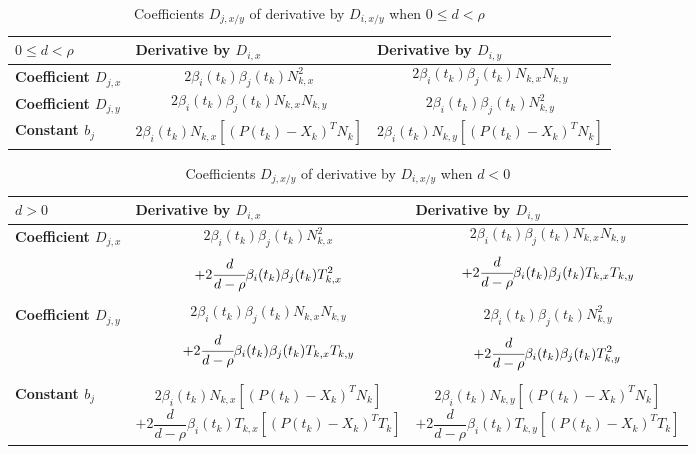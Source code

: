 \documentclass{article}
\begin{document}
\begin{table}[H]
    \centering
    \begin{tabular}{|l|p{6cm}|p{6cm}|}
        \hline
        $0 \leq d < \rho$
        &
        \textbf{Derivative by $D_{i,x}$}
        &
        \textbf{Derivative by $D_{i,y}$}
        \\
        \hline 
        \textbf{Coefficient $D_{j,x}$}
        &
        $$ 2 \beta_i(t_k) \beta_j(t_k) N_{k,x}^2 $$
        &
        $$ 2 \beta_i(t_k) \beta_j(t_k) N_{k,x}N_{k,y} $$
        \\
        \hline 
        \textbf{Coefficient $D_{j,y}$}
        &
        $$ 2 \beta_i(t_k) \beta_j(t_k) N_{k,x}N_{k,y} $$
        &
        $$ 2 \beta_i(t_k) \beta_j(t_k) N_{k,y}^2 $$
        \\
        \hline 
        \textbf{Constant $b_{j}$}
        &
        $$ 2\beta_i(t_k)N_{k,x} [(P(t_k)-X_k)^T N_k] $$
        &
        $$ 2\beta_i(t_k)N_{k,y} [(P(t_k)-X_k)^T N_k] $$
        \\
        \hline
    \end{tabular}
    \caption{Coefficients $D_{j,x/y}$ of derivative by $D_{i,x/y}$ when $0 \leq d < \rho$}
    \label{tab:bspline_lib}
\end{table}

\begin{table}[H]
    \centering
    \begin{tabular}{|l|p{6cm}|p{6cm}|}
        \hline
        $d > 0$
        &
        \textbf{Derivative by $D_{i,x}$}
        &
        \textbf{Derivative by $D_{i,y}$}
        \\
        \hline 
        \textbf{Coefficient $D_{j,x}$}
        &
        $$ 2 \beta_i(t_k) \beta_j(t_k) N_{k,x}^2 $$ 
        $$ + 2 \cfrac{d}{d-\rho} \beta_i(t_k) \beta_j(t_k) T_{k,x}^2 $$
        &
        $$ 2 \beta_i(t_k) \beta_j(t_k) N_{k,x}N_{k,y} $$
        $$ + 2 \cfrac{d}{d-\rho} \beta_i(t_k) \beta_j(t_k) T_{k,x}T_{k,y} $$
        \\
        \hline 
        \textbf{Coefficient $D_{j,y}$}
        &
        $$ 2 \beta_i(t_k) \beta_j(t_k) N_{k,x}N_{k,y} $$
        $$ + 2 \cfrac{d}{d-\rho} \beta_i(t_k) \beta_j(t_k) T_{k,x}T_{k,y} $$
        &
        $$ 2 \beta_i(t_k) \beta_j(t_k) N_{k,y}^2 $$
        $$ + 2 \cfrac{d}{d-\rho} \beta_i(t_k) \beta_j(t_k) T_{k,y}^2 $$
        \\
        \hline 
        \textbf{Constant $b_{j}$}
        &
        $$ 2\beta_i(t_k)N_{k,x} [(P(t_k)-X_k)^T N_k] $$ 
        $$ + 2 \frac{d}{d-\rho} \beta_i(t_k) T_{k,x} [(P(t_k)-X_k)^T T_k] $$
        &
        $$ 2\beta_i(t_k)N_{k,y} [(P(t_k)-X_k)^T N_k] $$
        $$ + 2 \frac{d}{d-\rho} \beta_i(t_k) T_{k,y} [(P(t_k)-X_k)^T T_k] $$
        \\
        \hline
    \end{tabular}
    \caption{Coefficients $D_{j,x/y}$ of derivative by $D_{i,x/y}$ when $d < 0$}
    \label{tab:bspline_lib}
\end{table}
\end{document}
